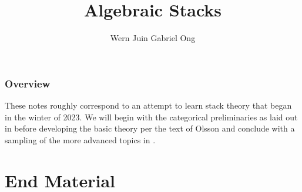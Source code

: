 \documentclass{amsart}
\theoremstyle{definition}
\numberwithin{equation}{section}
\begin{document}
\large
\title[Algebraic Stacks]{Algebraic Stacks}
\author{Wern Juin Gabriel Ong}
\address{Bowdoin College, Brunswick, Maine 04011}
\maketitle
\section*{Overview}
These notes roughly correspond to an attempt to learn stack theory that began in the winter of 2023. We will begin with the categorical preliminaries as laid out in \cite{Vistoli} before developing the basic theory per the text of Olsson \cite{Olsson} and conclude with a sampling of the more advanced topics in \cite[Part 7]{stacks-project}. 
\tableofcontents
\newpage













\part*{End Material}
\printbibliography
\end{document}
